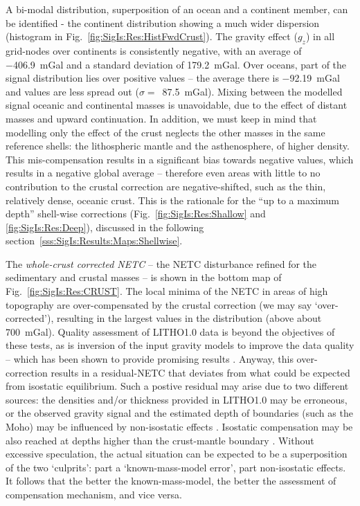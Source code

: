 A bi-modal distribution, superposition of an ocean and a continent member, can be identified - the continent distribution showing a much wider dispersion (histogram in Fig.~\ref{fig:SigIs:Res:HistFwdCrust}).
The gravity effect ($g_z$) in all grid-nodes over continents is consistently negative, with an average of \SI{-406.9}{mGal} and a standard deviation of \SI{179.2}{mGal}.
Over oceans, part of the signal distribution lies over positive values -- the average there is \SI{-92.19}{mGal} and values are less spread out ($\sigma =$~\SI{87.5}{mGal}).
Mixing between the modelled signal oceanic and continental masses is unavoidable, due to the effect of distant masses and upward continuation.
In addition, we must keep in mind that modelling only the effect of the crust neglects the other masses in the same reference shells: the lithospheric mantle and the asthenosphere, of higher density.
This mis-compensation results in a significant bias towards negative values, which results in a negative global average -- therefore even areas with little to no contribution to the crustal correction are negative-shifted, such as the thin, relatively dense, oceanic crust.
This is the rationale for the ``up to a maximum depth'' shell-wise corrections (Fig.~\ref{fig:SigIs:Res:Shallow} and \ref{fig:SigIs:Res:Deep}), discussed in the following section~\ref{sss:SigIs:Results:Maps:Shellwise}.

The \textit{whole-crust corrected NETC} -- the NETC disturbance refined for the sedimentary and crustal masses -- is shown in the bottom map of Fig.~\ref{fig:SigIs:Res:CRUST}.
The local minima of the NETC in areas of high topography are over-compensated by the crustal correction (we may say `over-corrected'), resulting in the largest values in the distribution (above about \SI[retain-explicit-plus]{+700}{mGal}).
Quality assessment of {LITHO1.0} data is beyond the objectives of these tests, as is inversion of the input gravity models to improve the data quality -- which has been shown to provide promising results \parencite[see e.g. ][]{Sjoberg2011}.
Anyway, this over-correction results in a residual-NETC that deviates from what could be expected from isostatic equilibrium.
Such a postive residual may arise due to two different sources: the densities and/or thickness provided in {LITHO1.0} may be erroneous, or the observed gravity signal and the estimated depth of boundaries (such as the Moho) may be influenced by non-isostatic effects \parencite[as defined by ][]{Bagherbandi2012}.
Isostatic compensation may be also reached at depths higher than the crust-mantle boundary \parencite{Martinec1994}.
Without excessive speculation, the actual situation can be expected to be a superposition of the two `culprits': part a `known-mass-model error', part non-isostatic effects.
It follows that the better the known-mass-model, the better the assessment of compensation mechanism, and vice versa.

